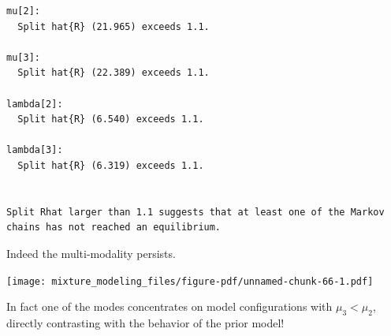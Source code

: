 \documentclass[
  letterpaper,
  DIV=11,
  numbers=noendperiod]{scrartcl}
\newenvironment{Shaded}{\begin{snugshade}}{\end{snugshade}}
\newcommand{\AttributeTok}[1]{\textcolor[rgb]{0.40,0.45,0.13}{#1}}
\newcommand{\ConstantTok}[1]{\textcolor[rgb]{0.56,0.35,0.01}{#1}}
\newcommand{\ControlFlowTok}[1]{\textcolor[rgb]{0.00,0.23,0.31}{#1}}
\newcommand{\DecValTok}[1]{\textcolor[rgb]{0.68,0.00,0.00}{#1}}
\newcommand{\FunctionTok}[1]{\textcolor[rgb]{0.28,0.35,0.67}{#1}}
\newcommand{\NormalTok}[1]{\textcolor[rgb]{0.00,0.23,0.31}{#1}}
\newcommand{\OtherTok}[1]{\textcolor[rgb]{0.00,0.23,0.31}{#1}}
\newcommand{\SpecialCharTok}[1]{\textcolor[rgb]{0.37,0.37,0.37}{#1}}
\newcommand{\StringTok}[1]{\textcolor[rgb]{0.13,0.47,0.30}{#1}}
\begin{document}
\begin{Shaded}
\end{Shaded}

\begin{verbatim}
mu[2]:
  Split hat{R} (21.965) exceeds 1.1.

mu[3]:
  Split hat{R} (22.389) exceeds 1.1.

lambda[2]:
  Split hat{R} (6.540) exceeds 1.1.

lambda[3]:
  Split hat{R} (6.319) exceeds 1.1.


Split Rhat larger than 1.1 suggests that at least one of the Markov
chains has not reached an equilibrium.
\end{verbatim}

Indeed the multi-modality persists.

\begin{Shaded}
\end{Shaded}

\texttt{[image: mixture\_modeling\_files/figure-pdf/unnamed-chunk-66-1.pdf]}

In fact one of the modes concentrates on model configurations with
\(\mu_{3} < \mu_{2}\), directly contrasting with the behavior of the
prior model!
\end{document}
